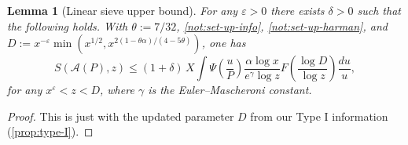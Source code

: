\documentclass[reqno,11pt]{amsart}
\newtheorem{lemma}[theorem]{Lemma}
\theoremstyle{remark}
\numberwithin{equation}{section}
\newcommand{\mA}{\mathcal{A}}
\newcommand{\eps}{\varepsilon}
\begin{document}
\begin{lemma}[Linear sieve upper bound] \label{lem:linear-sieve}
For any $\eps > 0$ there exists $\delta > 0$ such that the following holds.  With $\theta := 7/32$, \cref{not:set-up-info}, \cref{not:set-up-harman}, and $D := x^{-\eps} \min\left(x^{1/2}, x^{2(1-\theta \alpha)/(4-5\theta)}\right)$, one has
\[
    S(\mA(P), z) \le (1 + \delta)\, X \int \Psi\left(\frac{u}{P}\right) \frac{\alpha \log x}{e^\gamma \log z} F\left(\frac{\log D}{\log z}\right) \frac{du}{u},
\]
for any $x^\eps < z < D$, where $\gamma$ is the Euler--Mascheroni constant.
\end{lemma}

\begin{proof}
This is just \cite[Lemma 2]{merikoski2023largest} with the updated parameter $D$ from our Type I information (\cref{prop:type-I}).
\end{proof}
\end{document}
